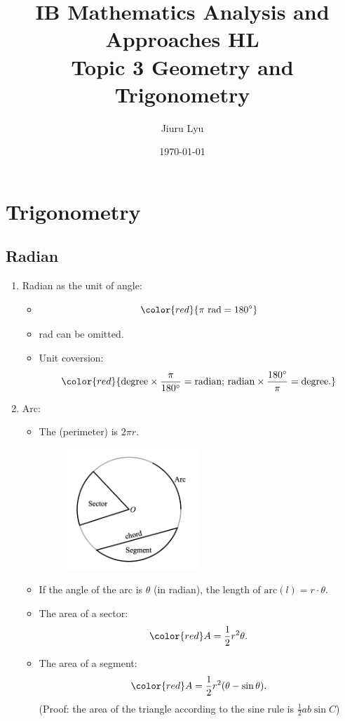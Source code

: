 \documentclass[12pt, a4paper]{article}
\title{\textbf{IB Mathematics Analysis and Approaches HL}\\
Topic 3 Geometry and Trigonometry}
\author{Jiuru Lyu}
\date{\today}
\begin{document}
\maketitle
\tableofcontents

\newpage

\section{Trigonometry}
\subsection{Radian}
\begin{enumerate}
  \item Radian as the unit of angle: 
  \begin{itemize}
    \item $${\color{red}{\pi\ \text{rad}=180^\circ}}$$
    \item rad can be omitted. {}
    \item Unit coversion: $${\color{red}{\text{degree}\times\frac{\pi}{180^\circ}=\text{radian;\ radian}\times\frac{180^\circ}{\pi}=\text{degree}.}}$$
  \end{itemize}
  \item Arc: 
  \begin{itemize}
    \item The \textbf{\color{red}{circumference}} (perimeter) is $2\pi r$.
    \begin{figure}[H]
      \centering
      \includegraphics[width=0.5\textwidth]{Fig.3.18.jpg}
    \end{figure}
    \item If the angle of the arc is $\theta$ (in radian), the length of $\text{arc}(l)=r\cdot\theta$.
    \item The area of a sector: $$\color{red}A=\frac{1}{2}r^2\theta.$$
    \item The area of a segment: $$\color{red}A=\frac{1}{2}r^2(\theta-\sin\theta).$$(Proof: the area of the triangle according to the sine rule is $\frac{1}{2}ab\sin C$)
  \end{itemize}
\end{enumerate}
\end{document}
